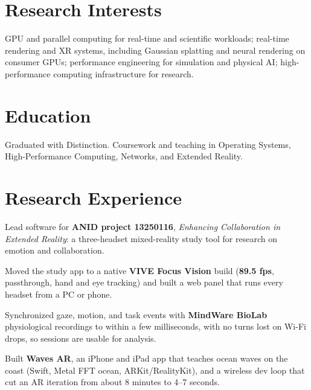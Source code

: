 \documentclass[letterpaper,10pt]{article}
\begin{document}

\section{Research Interests}
{\small GPU and parallel computing for real-time and scientific workloads; real-time rendering and XR systems, including Gaussian splatting and neural rendering on consumer GPUs; performance engineering for simulation and physical AI; high-performance computing infrastructure for research.\par}

\section{Education}
\begin{points}
  \item Graduated with Distinction. Coursework and teaching in Operating Systems, High-Performance Computing, Networks, and Extended Reality.
\end{points}

\section{Research Experience}
\begin{points}
  \item Lead software for \textbf{ANID project 13250116}, \emph{Enhancing Collaboration in Extended Reality}: a three-headset mixed-reality study tool for research on emotion and collaboration.
  \item Moved the study app to a native \textbf{VIVE Focus Vision} build (\textbf{89.5 fps}, passthrough, hand and eye tracking) and built a web panel that runs every headset from a PC or phone.
  \item Synchronized gaze, motion, and task events with \textbf{MindWare BioLab} physiological recordings to within a few milliseconds, with no turns lost on Wi-Fi drops, so sessions are usable for analysis.
  \item Built \textbf{Waves AR}, an iPhone and iPad app that teaches ocean waves on the coast (Swift, Metal FFT ocean, ARKit/RealityKit), and a wireless dev loop that cut an AR iteration from about 8 minutes to 4--7 seconds.
\end{points}
\end{document}
